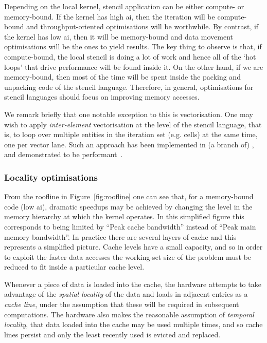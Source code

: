 Depending on the local kernel, stencil application can be either compute- or memory-bound.
If the kernel has high \gls{ai}, then the iteration will be compute-bound and throughput-oriented optimisations will be worthwhile.
By contrast, if the kernel has low \gls{ai}, then it will be memory-bound and data movement optimisations will be the ones to yield results.
The key thing to observe is that, if compute-bound, the local stencil is doing a lot of work and hence all of the `hot loops' that drive performance will be found inside it.
On the other hand, if we are memory-bound, then most of the time will be spent inside the packing and unpacking code of the stencil language.
Therefore, in general, optimisations for stencil languages should focus on improving memory accesses.

We remark briefly that one notable exception to this is vectorisation.
One may wish to apply \textit{inter-element} vectorisation at the level of the stencil language, that is, to loop over multiple entities in the iteration set (e.g. cells) at the same time, one per vector lane.
Such an approach has been implemented in (a branch of) , and demonstrated to be performant~\cite{sunStudyVectorizationMatrixfree2020}.

\subsubsection{Locality optimisations}

From the roofline in Figure~\ref{fig:roofline} one can see that, for a memory-bound code (low \gls{ai}), dramatic speedups may be achieved by changing the level in the memory hierarchy at which the kernel operates.
In this simplified figure this corresponds to being limited by ``Peak cache bandwidth'' instead of ``Peak main memory bandwidth''.
In practice there are several layers of cache and this represents a simplified picture.
Cache levels have a small capacity, and so in order to exploit the faster data accesses the working-set size of the problem must be reduced to fit inside a particular cache level.

Whenever a piece of data is loaded into the cache, the hardware attempts to take advantage of the \textit{spatial locality} of the data and loads in adjacent entries as a \textit{cache line}, under the assumption that these will be required in subsequent computations.
The hardware also makes the reasonable assumption of \textit{temporal locality}, that data loaded into the cache may be used multiple times, and so cache lines persist and only the least recently used is evicted and replaced.

